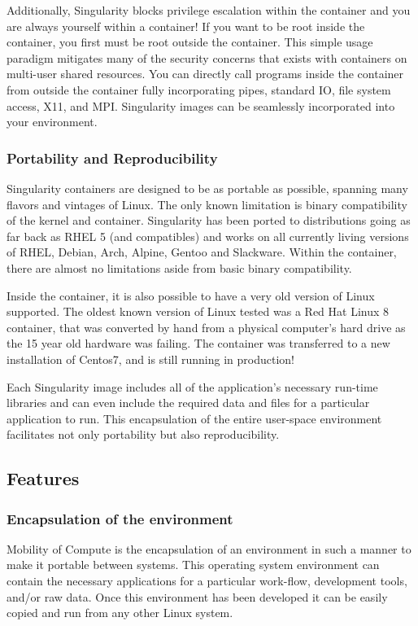 \documentclass[letterpaper,10pt,english]{sphinxmanual}
\begin{document}
Additionally, Singularity blocks privilege escalation within the container and you are always yourself within a container! If you want to be root inside the container, you first must be root outside the container. This simple usage paradigm mitigates many of the security concerns that exists with containers on multi-user shared resources. You can directly call programs inside the container from outside the container fully incorporating pipes, standard IO, file system access, X11, and MPI. Singularity images can be seamlessly incorporated into your environment.


\subsubsection{Portability and Reproducibility}
\label{\detokenize{introduction:portability-and-reproducibility}}
Singularity containers are designed to be as portable as possible, spanning many flavors and vintages of Linux. The only known limitation is binary compatibility of the kernel and container. Singularity has been ported to distributions going as far back as RHEL 5 (and compatibles) and works on all currently living versions of RHEL, Debian, Arch, Alpine, Gentoo and Slackware. Within the container, there are almost no limitations aside from basic binary compatibility.

Inside the container, it is also possible to have a very old version of Linux supported. The oldest known version of Linux tested was a Red Hat Linux 8 container, that was converted by hand from a physical computer’s hard drive as the 15 year old hardware was failing. The container was transferred to a new installation of Centos7, and is still running in production!

Each Singularity image includes all of the application’s necessary run-time libraries and can even include the required data and files for a particular application to run. This encapsulation of the entire user-space environment facilitates not only portability but also reproducibility.


\subsection{Features}
\label{\detokenize{introduction:features}}

\subsubsection{Encapsulation of the environment}
\label{\detokenize{introduction:encapsulation-of-the-environment}}
Mobility of Compute is the encapsulation of an environment in such a manner to make it portable between systems. This operating system environment can contain the necessary applications for a particular work-flow, development tools, and/or raw data. Once this environment has been developed it can be easily copied and run from any other Linux system.
\end{document}
